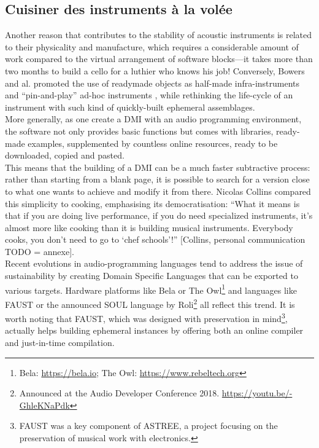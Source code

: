\subsection{Cuisiner des instruments à la volée}
Another reason that contributes to the stability of acoustic instruments is related to their physicality and manufacture, which requires a considerable amount of work compared to the virtual arrangement of software blocks—it takes more than two months to build a cello for a luthier who knows his job! Conversely, Bowers and al. promoted the use of readymade objects as half-made infra-instruments \cite{bowers_not_2005} and “pin-and-play” ad-hoc instruments \cite{bowers_creating_2006}, while rethinking the life-cycle of an instrument with such kind of quickly-built ephemeral assemblages.\\
\indent More generally, as one create a DMI with an audio programming environment, the software not only provides basic functions but comes with libraries, ready-made examples, supplemented by countless online resources, ready to be downloaded, copied and pasted.\\
\indent This means that the building of a DMI can be a much faster subtractive process: rather than starting from a blank page, it is possible to search for a version close to what one wants to achieve and modify it from there. Nicolas Collins compared this simplicity to cooking, emphasising its democratisation: “What it means is that if you are doing live performance, if you do need specialized instruments, it's almost more like cooking than it is building musical instruments. Everybody cooks, you don't need to go to ‘chef schools’!” [Collins, personal communication TODO = annexe].\\
\indent Recent evolutions in audio-programming languages tend to address the issue of sustainability by creating Domain Specific Languages that can be exported to various targets. Hardware platforms like Bela or The Owl\footnote{Bela: \url{https://bela.io}; The Owl: \url{https://www.rebeltech.org}} and languages like FAUST \cite{orlarey_faust_2008} or the announced SOUL language by Roli\footnote{Announced at the Audio Developer Conference 2018. \url{https://youtu.be/-GhleKNaPdk}} all reflect this trend. It is worth noting that FAUST, which was designed with preservation in mind\footnote{FAUST was a key component of ASTREE, a project focusing on the preservation of musical work with electronics.}, actually helps building ephemeral instances by offering both an online compiler and just-in-time compilation.
	
